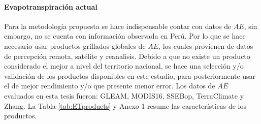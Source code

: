 \documentclass[12pt]{article}
\begin{document}


\clearpage

\paragraph{Evapotranspiración actual}\mbox{}

Para la metodología propuesta se hace indispensable contar con datos de $AE$, sin embargo, no se cuenta con información observada en Perú. Por lo que se hace necesario usar productos grillados globales de $AE$, los cuales provienen de datos de percepción remota, satélite y reanalisis. Debido a que no existe un producto considerado el mejor a nivel del territorio nacional, se hace una selección y/o validación de los productos disponibles en este estudio, para posteriormente usar el de mejor rendimiento y/o que presente menor error. Los datos de $AE$ evaluados en esta tesis fueron: GLEAM, MODIS16, SSEBop, TerraClimate y Zhang. La Tabla \ref{tab:ETproducts} y Anexo 1 resume las características de los productos.
\end{document}
